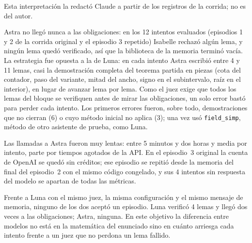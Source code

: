 Esta interpretación la redactó Claude a partir de los registros de la corrida; no es del autor.

Astra no llegó nunca a las obligaciones: en los 12 intentos evaluados (episodios 1 y 2 de la corrida original y el episodio 3 repetido) Isabelle rechazó algún lema, y ningún lema quedó verificado, así que la biblioteca de la memoria terminó vacía. La estrategia fue opuesta a la de Luna: en cada intento Astra escribió entre 4 y 11 lemas, casi la demostración completa del teorema partida en piezas (cota del contador, paso del variante, mitad del ancho, signo en el subintervalo, raíz en el interior), en lugar de avanzar lema por lema. Como el juez exige que todos los lemas del bloque se verifiquen antes de mirar las obligaciones, un solo error bastó para perder cada intento. Los primeros errores fueron, sobre todo, demostraciones que no cierran (6) o cuyo método inicial no aplica (3); una vez usó \texttt{field\_simp}, método de otro asistente de prueba, como Luna.

Las llamadas a Astra fueron muy lentas: entre 5 minutos y dos horas y media por intento, parte por tiempos agotados de la API. En el episodio~3 original la cuenta de OpenAI se quedó sin créditos; ese episodio se repitió desde la memoria del final del episodio~2 con el mismo código congelado, y sus 4 intentos sin respuesta del modelo se apartan de todas las métricas.

Frente a Luna con el mismo juez, la misma configuración y el mismo mensaje de memoria, ninguno de los dos aceptó un episodio. Luna verificó 4 lemas y llegó dos veces a las obligaciones; Astra, ninguna. En este objetivo la diferencia entre modelos no está en la matemática del enunciado sino en cuánto arriesga cada intento frente a un juez que no perdona un lema fallido.

